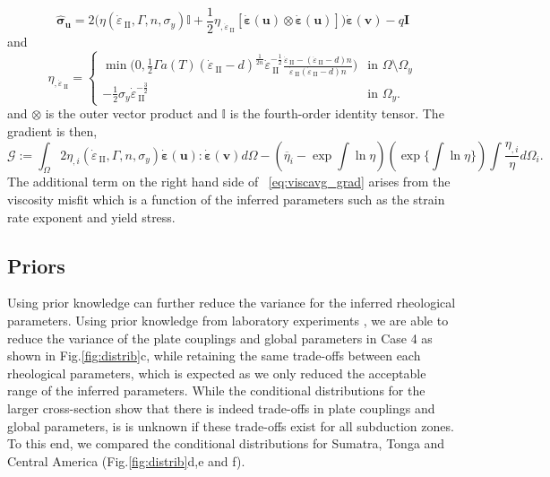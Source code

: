 \documentclass[12pt]{article}
\newcommand{\IIinv}{{\dot\varepsilon}_{\mathrm{\!\!\:II}}}
\newcommand{\uu}{{\ensuremath{\boldsymbol{u}}}}
\newcommand{\vv}{{\ensuremath{\boldsymbol{v}}}}
\newcommand{\ssigma}{{\ensuremath{\boldsymbol{\sigma}}}}
\newcommand{\strain}{{\ensuremath{\dot{\boldsymbol{\varepsilon}}}}}
\begin{document}
{\begin{equation}\label{eq:sigma_hat}
\hat\ssigma_\uu  = 2 \Big(\eta(\IIinv,\Gamma, n,
\sigma_y)\mathbb{I}+\frac{1}{2} \eta_{,\IIinv} [\strain(\uu)\otimes
      \strain(\uu)]\Big)\strain(\vv) -q\textbf{I}
\end{equation}
and
\begin{equation}
  \eta_{,\IIinv} \!\!=\!\!
  \begin{cases}
   \min\!\Big(0, \frac{1}{2}\Gamma
   a(T)(\IIinv-d)^{\frac{1}{2n}}\IIinv^{-\frac{1}{2}}\frac{\IIinv-(\IIinv-d)n}{\IIinv(\IIinv-d)n}\Big)
   &\text{in } \Omega\setminus\Omega_y 
   \\
   -\frac{1}{2}\sigma_{y}\IIinv^{-\frac{3}{2}}  &\text{in } \Omega_y.
  \end{cases}
\end{equation}
 and $\otimes$ is the outer vector product and $\mathbb{I}$ is the fourth-order identity tensor. The gradient is then, 
\begin{equation}
\mathcal G:= \int_{\Omega} 2 \eta_{,i}(\IIinv, \Gamma, n, \sigma_y)\strain(\uu):\strain(\vv) d\Omega - (\overline{\eta}_i-\exp\int\ln \eta)(\exp\{\int\ln \eta\})\int\frac{\eta_{,i}}{\eta}d\Omega_i.\
\label{eq:viscavg_grad}
\end{equation}
The additional term on the right hand side of ~\eqref{eq:viscavg_grad} arises from the viscosity misfit which is a function of the inferred parameters such as the strain rate exponent and yield stress.


\subsection*{Priors}

Using prior knowledge can further reduce the variance for the inferred rheological parameters. Using prior knowledge from laboratory experiments \citep{korenaga2008new}, we are able to reduce the variance of the plate couplings and global parameters in Case 4 as shown in Fig.\ref{fig:distrib}c, while retaining the same trade-offs between each rheological parameters, which is expected as we only reduced the acceptable range of the inferred parameters. While the conditional distributions for the larger cross-section show that there is indeed trade-offs in plate couplings and global parameters, is is unknown if these trade-offs exist for all subduction zones. To this end, we compared the conditional distributions for Sumatra, Tonga and Central America (Fig.\ref{fig:distrib}d,e and f). 


}
\end{document}
